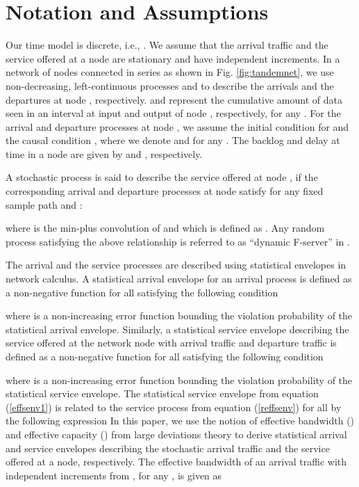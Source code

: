 \documentclass[letterpaper]{IEEEtran}
\begin{document}
\section{Notation and Assumptions}
\label{sec:SNC}
Our time model is discrete, i.e., . We assume that the arrival traffic and the service offered at a node are stationary and have independent increments. In a network of nodes connected in series as shown in Fig. \ref{fig:tandemnet}, we use non-decreasing, left-continuous processes  and  to describe the arrivals and the departures at node , respectively.  and  represent the cumulative amount of data seen in an interval  at input and output of node , respectively, for any . For the arrival and departure processes at node , we assume the initial condition  for  and the causal condition , where we denote  and  for any . The backlog  and delay  at time  in a node  are given by  and , respectively.

A stochastic process  is said to describe the service offered at node , if the corresponding arrival and departure processes at node  satisfy for any fixed sample path and :

where  is the min-plus convolution of  and  which is defined as . Any random process  satisfying the above relationship is referred to as ``dynamic F-server'' in \cite{chang:2000}. 

The arrival and the service processes are described using statistical envelopes in network calculus. A statistical arrival envelope  for an arrival process  is defined as a non-negative function for all  satisfying the following condition

where  is a non-increasing error function bounding the violation probability of the statistical arrival envelope. Similarly, a statistical service envelope  describing the service offered at the network node with arrival traffic  and departure traffic  is defined as a non-negative function for all  satisfying the following condition

where  is a non-increasing error function bounding the violation probability of the statistical service envelope. The statistical service envelope from equation (\ref{effsenv1}) is related to the service process from equation (\ref{reffsenv}) for all  by the following expression
 In this paper, we use the notion of effective bandwidth () \cite{kelly:1996} and effective capacity () \cite{kumar:2001,wu:2003,MMB:2008} from large deviations theory to derive statistical arrival and service envelopes describing the stochastic arrival traffic and the service offered at a node, respectively. The effective bandwidth of an arrival traffic  with independent increments from \cite{kelly:1996}, for any , is given as
\end{document}
